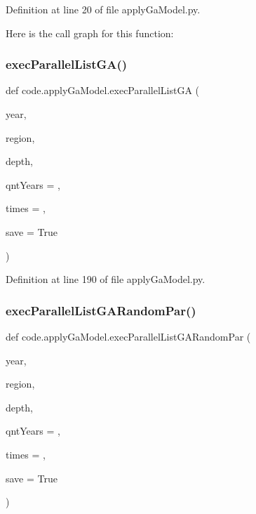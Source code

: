 Definition at line 20 of file apply\+Ga\+Model.\+py.

Here is the call graph for this function\+:
\mbox{\label{namespacecode_1_1apply_ga_model_abd22820f394722a6bb41b706dbe25a3e}} 
\subsubsection{\texorpdfstring{exec\+Parallel\+List\+G\+A()}{execParallelListGA()}}
{\footnotesize\ttfamily def code.\+apply\+Ga\+Model.\+exec\+Parallel\+List\+GA (\begin{DoxyParamCaption}\item[{}]{year,  }\item[{}]{region,  }\item[{}]{depth,  }\item[{}]{qnt\+Years = {},  }\item[{}]{times = {},  }\item[{}]{save = {\ttfamily True} }\end{DoxyParamCaption})}



Definition at line 190 of file apply\+Ga\+Model.\+py.

\mbox{\label{namespacecode_1_1apply_ga_model_a03f8861e04a11502b257aca2939c80c9}} 
\subsubsection{\texorpdfstring{exec\+Parallel\+List\+G\+A\+Random\+Par()}{execParallelListGARandomPar()}}
{\footnotesize\ttfamily def code.\+apply\+Ga\+Model.\+exec\+Parallel\+List\+G\+A\+Random\+Par (\begin{DoxyParamCaption}\item[{}]{year,  }\item[{}]{region,  }\item[{}]{depth,  }\item[{}]{qnt\+Years = {},  }\item[{}]{times = {},  }\item[{}]{save = {\ttfamily True} }\end{DoxyParamCaption})}



